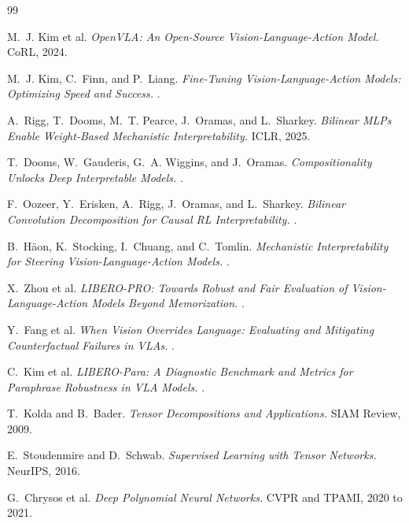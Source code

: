 \documentclass{article}
\begin{document}
\clearpage
\begin{thebibliography}{99}

M.~J. Kim et al.
\newblock \emph{OpenVLA: An Open-Source Vision-Language-Action Model.}
\newblock CoRL, 2024.

M.~J. Kim, C.~Finn, and P.~Liang.
\newblock \emph{Fine-Tuning Vision-Language-Action Models: Optimizing Speed and Success.}
.

A.~Rigg, T.~Dooms, M.~T. Pearce, J.~Oramas, and L.~Sharkey.
\newblock \emph{Bilinear MLPs Enable Weight-Based Mechanistic Interpretability.}
\newblock ICLR, 2025.

T.~Dooms, W.~Gauderis, G.~A. Wiggins, and J.~Oramas.
\newblock \emph{Compositionality Unlocks Deep Interpretable Models.}
.

F.~Oozeer, Y.~Erisken, A.~Rigg, J.~Oramas, and L.~Sharkey.
\newblock \emph{Bilinear Convolution Decomposition for Causal RL Interpretability.}
.

B.~H\"aon, K.~Stocking, I.~Chuang, and C.~Tomlin.
\newblock \emph{Mechanistic Interpretability for Steering Vision-Language-Action Models.}
.

X.~Zhou et al.
\newblock \emph{LIBERO-PRO: Towards Robust and Fair Evaluation of Vision-Language-Action
Models Beyond Memorization.}
.

Y.~Fang et al.
\newblock \emph{When Vision Overrides Language: Evaluating and Mitigating Counterfactual
Failures in VLAs.}
.

C.~Kim et al.
\newblock \emph{LIBERO-Para: A Diagnostic Benchmark and Metrics for Paraphrase Robustness in
VLA Models.}
.

T.~Kolda and B.~Bader.
\newblock \emph{Tensor Decompositions and Applications.}
\newblock SIAM Review, 2009.

E.~Stoudenmire and D.~Schwab.
\newblock \emph{Supervised Learning with Tensor Networks.}
\newblock NeurIPS, 2016.

G.~Chrysos et al.
\newblock \emph{Deep Polynomial Neural Networks.}
\newblock CVPR and TPAMI, 2020 to 2021.

\end{thebibliography}
\end{document}
